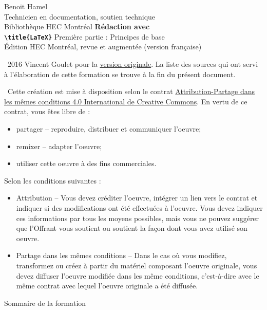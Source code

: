 \scriptsize

\begin{frame}
	Benoit Hamel \\
	Technicien en documentation, soutien technique \\
	Bibliothèque HEC Montréal
	\vfill
	{
		\Huge\bfseries
		Rédaction avec \\
		\texttt{\textbackslash title\{\textrm{\LaTeX}\}}
	}
	\vfill
	Première partie : Principes de base \\
	Édition HEC Montréal, revue et augmentée (version française)
\end{frame}

\begin{frame}
	\faCopyright\ 2016 Vincent Goulet pour la 
	\href{https://ctan.org/pkg/formation-latex-ul}{version originale}. La liste des sources qui ont 
	servi à l'élaboration de cette formation se trouve à la fin du présent document.
	
	\faCreativeCommons\ Cette création est mise à disposition selon le contrat 
	\href{http://creativecommons.org/licenses/by-sa/4.0/deed.fr}{%
	Attribution-Partage dans les mêmes conditions 4.0 International de Creative Commons}. 
	En vertu de ce contrat, vous êtes libre de :
	
	\begin{itemize}
		\item partager -- reproduire, distribuer et communiquer l’oeuvre;
		\item remixer -- adapter l’oeuvre;
		\item utiliser cette oeuvre à des fins commerciales.
	\end{itemize}

	Selon les conditions suivantes :
	
	\begin{itemize}
		\item Attribution -- Vous devez créditer l’oeuvre, intégrer un lien vers le contrat et indiquer si des modifications ont été effectuées à l’oeuvre. Vous devez indiquer ces informations par tous les moyens possibles, mais vous ne pouvez suggérer que l’Offrant vous soutient ou soutient la façon dont vous avez utilisé son oeuvre.
		\item Partage dans les mêmes conditions -- Dans le cas où vous modifiez, transformez ou créez à partir du matériel composant l’oeuvre
		originale, vous devez diffuser l’oeuvre modifiée dans les même conditions, c’est-à-dire avec le même contrat avec lequel l’oeuvre originale a été diffusée.
	\end{itemize}
\end{frame}

\begin{frame}{Sommaire de la formation}
	\begin{columns}[onlytextwidth]
		\begin{column}{.49\textwidth}
			\tableofcontents[sections={1-3}]
		\end{column}
		\begin{column}{.49\textwidth}
			\tableofcontents[sections={4-6}]
		\end{column}
	\end{columns}
\end{frame}